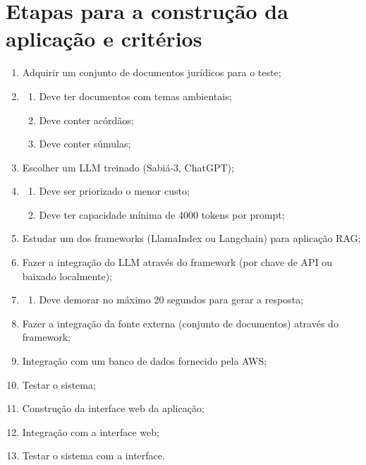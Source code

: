 \documentclass[
	12pt,				%
	openright,			%
	oneside,			    %
	a4paper,				%
	english,			%
	french,			%
	spanish,			%
	brazil			%
	]{abntex2}
\begin{document}
\section{Etapas para a construção da aplicação e critérios}
\begin{enumerate}
  \item Adquirir um conjunto de documentos jurídicos para o teste;
  \item 
    \begin{enumerate}
    \item Deve ter documentos com temas ambientais;
    \item Deve conter acórdãos;
    \item Deve conter súmulas;
    \end{enumerate}
    
  \item Escolher um LLM treinado (Sabiá-3, ChatGPT);
  \item 
    \begin{enumerate}
    \item Deve ser priorizado o menor custo;
    \item Deve ter capacidade mínima de 4000 tokens por prompt;
    \end{enumerate}
  \item Estudar um dos frameworks (LlamaIndex ou Langchain) para aplicação RAG;
  \item Fazer a integração do LLM através do framework (por chave de API ou baixado localmente);
  \item 
    \begin{enumerate}
    \item Deve demorar no máximo 20 segundos para gerar a resposta;
    \end{enumerate}

  \item Fazer a integração da fonte externa (conjunto de documentos) através do framework;
  \item Integração com um banco de dados fornecido pela AWS;
  \item Testar o sistema;
  \item Construção da interface web da aplicação;
  \item Integração com a interface web;
  \item Testar o sistema com a interface.  
\end{enumerate}
\end{document}
